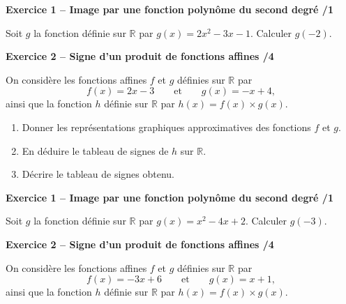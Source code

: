 \documentclass[10pt,a4paper]{article}
\begin{document}


\textbf{Exercice 1 -- Image par une fonction polynôme du second degré \hfill /1}

Soit \(g\) la fonction définie sur \(\mathbb{R}\) par \(g(x)=2x^2-3x-1\). Calculer \(g(-2)\).

\vspace{2cm}

\textbf{Exercice 2 -- Signe d'un produit de fonctions affines \hfill /4}

On considère les fonctions affines \(f\) et \(g\) définies sur \(\mathbb{R}\) par
\[
f(x)=2x-3 \qquad\text{et}\qquad g(x)=-x+4,
\]
ainsi que la fonction \(h\) définie sur \(\mathbb{R}\) par \(h(x)=f(x)\times g(x)\).

\begin{enumerate}
\item Donner les représentations graphiques approximatives des fonctions \(f\) et \(g\).

\vspace{2cm}

\item En déduire le tableau de signes de \(h\) sur \(\mathbb{R}\).

\vspace{4cm}

\item Décrire le tableau de signes obtenu.
\end{enumerate}

\newpage



\textbf{Exercice 1 -- Image par une fonction polynôme du second degré \hfill /1}

Soit \(g\) la fonction définie sur \(\mathbb{R}\) par \(g(x)=x^2-4x+2\). Calculer \(g(-3)\).

\vspace{2cm}

\textbf{Exercice 2 -- Signe d'un produit de fonctions affines \hfill /4}

On considère les fonctions affines \(f\) et \(g\) définies sur \(\mathbb{R}\) par
\[
f(x)=-3x+6 \qquad\text{et}\qquad g(x)=x+1,
\]
ainsi que la fonction \(h\) définie sur \(\mathbb{R}\) par \(h(x)=f(x)\times g(x)\).
\end{document}
